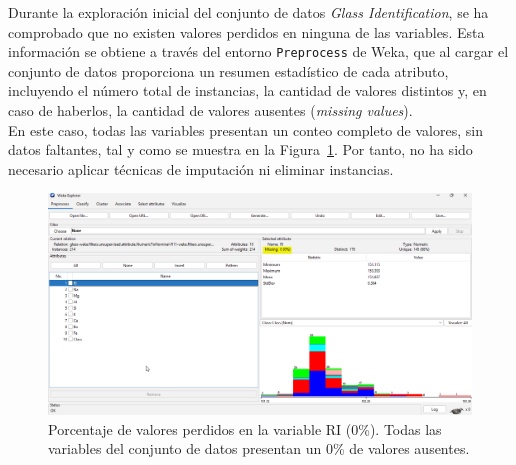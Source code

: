 \documentclass{article}
\begin{document}

Durante la exploración inicial del conjunto de datos \textit{Glass Identification}, se ha comprobado que no existen valores perdidos en ninguna de las variables. Esta información se obtiene a través del entorno \texttt{Preprocess} de Weka, que al cargar el conjunto de datos proporciona un resumen estadístico de cada atributo, incluyendo el número total de instancias, la cantidad de valores distintos y, en caso de haberlos, la cantidad de valores ausentes (\textit{missing values}).\\

En este caso, todas las variables presentan un conteo completo de valores, sin datos faltantes, tal y como se muestra en la Figura~\ref{fig:missing_values}. Por tanto, no ha sido necesario aplicar técnicas de imputación ni eliminar instancias.\\

\begin{figure}[!ht]
    \centering
    \includegraphics[width=1\linewidth]{Imágenes/missing_values.png}
    \caption{Porcentaje de valores perdidos en la variable RI (0\%). Todas las variables del conjunto de datos presentan un 0\% de valores ausentes.}
    \label{fig:missing_values}
\end{figure}

\end{document}
